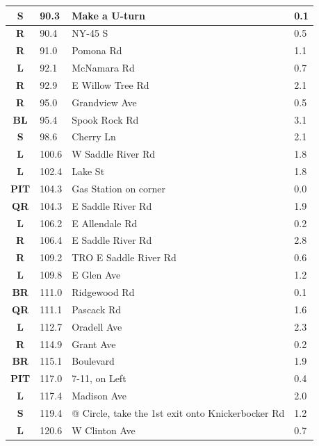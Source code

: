 \documentclass[11pt]{article}
\begin{document}
\begin{center}
\begin{supertabular}{|c|p{0.30in}|p{2.25in}|l|}
 \textbf{S} &  90.3 & Make a U-turn &   0.1 \\ \hline
{} \textbf{R} &  90.4 & NY-45 S &   0.5 \\ \hline
{} \textbf{R} &  91.0 & Pomona Rd &   1.1 \\ \hline
 \textbf{L} &  92.1 & McNamara Rd &   0.7 \\ \hline
{} \textbf{R} &  92.9 & E Willow Tree Rd &   2.1 \\ \hline
{} \textbf{R} &  95.0 & Grandview Ave &   0.5 \\ \hline
 \textbf{BL} &  95.4 & Spook Rock Rd &   3.1 \\ \hline
 \textbf{S} &  98.6 & Cherry Ln &   2.1 \\ \hline
 \textbf{L} & 100.6 & W Saddle River Rd &   1.8 \\ \hline
 \textbf{L} & 102.4 & Lake St &   1.8 \\ \hline
{} \textbf{PIT} & 104.3 & Gas Station on corner &   0.0 \\ \hline
{} \textbf{QR} & 104.3 & E Saddle River Rd &   1.9 \\ \hline
 \textbf{L} & 106.2 & E Allendale Rd &   0.2 \\ \hline
{} \textbf{R} & 106.4 & E Saddle River Rd &   2.8 \\ \hline
{} \textbf{R} & 109.2 & TRO E Saddle River Rd &   0.6 \\ \hline
 \textbf{L} & 109.8 & E Glen Ave &   1.2 \\ \hline
{} \textbf{BR} & 111.0 & Ridgewood Rd &   0.1 \\ \hline
{} \textbf{QR} & 111.1 & Pascack Rd &   1.6 \\ \hline
 \textbf{L} & 112.7 & Oradell Ave &   2.3 \\ \hline
{} \textbf{R} & 114.9 & Grant Ave &   0.2 \\ \hline
{} \textbf{BR} & 115.1 & Boulevard &   1.9 \\ \hline
{} \textbf{PIT} & 117.0 & 7-11, on Left &   0.4 \\ \hline
 \textbf{L} & 117.4 & Madison Ave &   2.0 \\ \hline
 \textbf{S} & 119.4 & @ Circle, take the 1st exit onto Knickerbocker Rd &   1.2 \\ \hline
 \textbf{L} & 120.6 & W Clinton Ave &   0.7 \\ \hline

\end{supertabular}
\end{center}
\end{document}
